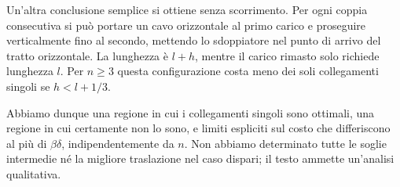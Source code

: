 {Un'altra conclusione semplice si ottiene senza scorrimento.
Per ogni coppia consecutiva si pu\`o portare un cavo orizzontale al primo
carico e proseguire verticalmente fino al secondo, mettendo lo sdoppiatore
nel punto di arrivo del tratto orizzontale.
La lunghezza \`e $l+h$, mentre il carico rimasto solo richiede lunghezza $l$.
Per $n\ge3$ questa configurazione costa meno dei soli collegamenti singoli
se $h<l+1/3$.

Abbiamo dunque una regione in cui i collegamenti singoli sono ottimali,
una regione in cui certamente non lo sono, e limiti espliciti sul costo
che differiscono al pi\`u di $\beta\delta$, indipendentemente da $n$.
Non abbiamo determinato tutte le soglie intermedie n\'e la migliore
traslazione nel caso dispari; il testo ammette un'analisi qualitativa.
}
\renewcommand{\SoluzioniAlternative}{}
\renewcommand{\Osservazioni}{}
\renewcommand{\Commenti}{}
